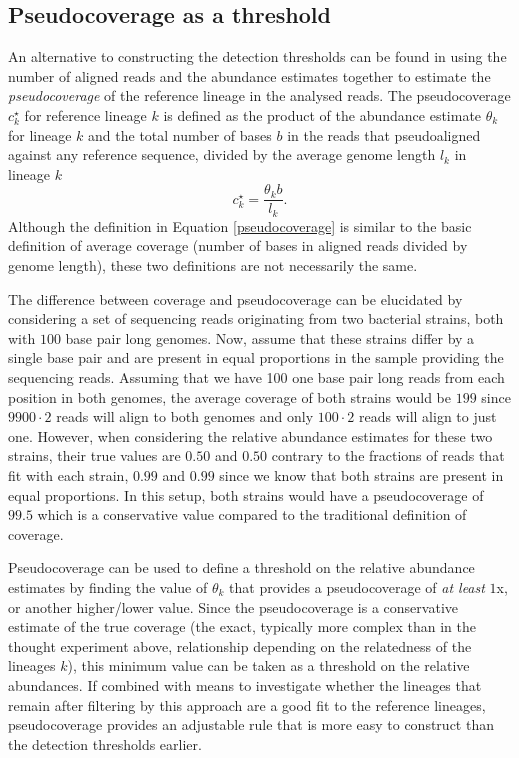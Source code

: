 \documentclass[officiallayout]{tktla}
\begin{document}
\subsection{Pseudocoverage as a threshold}

An alternative to constructing the detection thresholds can be found
in using the number of aligned reads and the abundance estimates
together to estimate the \textit{pseudocoverage} of the reference
lineage in the analysed reads. The pseudocoverage $c^{\star}_{k}$ for
reference lineage $k$ is defined as the product of the abundance
estimate $\theta_{k}$ for lineage $k$ and the total number of bases
$b$ in the reads that pseudoaligned against any reference sequence,
divided by the average genome length $l_{k}$ in lineage $k$
\begin{equation}
  \label{pseudocoverage}
  c_{k}^{\star} = \frac{\theta_{k}b}{l_{k}}.
\end{equation}
Although the definition in Equation \ref{pseudocoverage} is similar to
the basic definition of average coverage (number of bases in aligned
reads divided by genome length), these two definitions are not
necessarily the same.

The difference between coverage and pseudocoverage can be elucidated
by considering a set of sequencing reads originating from two
bacterial strains, both with $100$ base pair long genomes. Now, assume
that these strains differ by a single base pair and are present in
equal proportions in the sample providing the sequencing
reads. Assuming that we have 100 one base pair long reads from each
position in both genomes, the average coverage of both strains would
be $199$ since $9900\cdot2$ reads will align to both genomes and only
$100\cdot2$ reads will align to just one. However, when considering
the relative abundance estimates for these two strains, their true
values are $0.50$ and $0.50$ \textemdash{ } contrary to the fractions
of reads that fit with each strain, $0.99$ and $0.99$ \textemdash{ }
since we know that both strains are present in equal proportions. In
this setup, both strains would have a pseudocoverage of $99.5$ which
is a conservative value compared to the traditional definition of
coverage.

Pseudocoverage can be used to define a threshold on the relative
abundance estimates by finding the value of $\theta_{k}$ that provides
a pseudocoverage of \textit{at least} $1$x, or another higher/lower
value. Since the pseudocoverage is a conservative estimate of the true
coverage (the exact, typically more complex than in the thought
experiment above, relationship depending on the relatedness of the
lineages $k$), this minimum value can be taken as a threshold on the
relative abundances. If combined with means to investigate whether the
lineages that remain after filtering by this approach are a good fit
to the reference lineages, pseudocoverage provides an adjustable rule
that is more easy to construct than the detection thresholds earlier.
\end{document}
